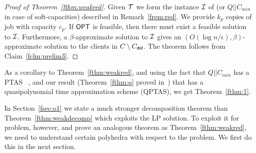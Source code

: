 \begin{proof}[Proof of Theorem~\ref{fthm:weakred}]
	Given ${\cal T}$ we form the instance ${\cal I}$  of \cckp (or $Q||C_{min}$ in case of soft-capacities) described in Remark~\ref{frem:red}. We provide $k_p$ copies of job with capacity $c_p$. If $\mathsf{OPT}$ is feasible, then there must exist a feasible solution to ${\cal I}$. Furthermore, a $\beta$-approximate solution to ${\cal I}$ gives an $\left(O(\log n/\epsilon),\beta\right)$-approximate solution to the clients in $C\setminus C_{\mathsf{del}}$. The theorem follows from Claim~\ref{fclm:prelim3}.
%	
\end{proof}

As a corollary to Theorem~\ref{fthm:weakred}, and using the fact that $Q||C_{min}$ has a PTAS ~\cite{AzarE98},  and our result (Theorem~\ref{fthm:q} proved in~) that \cckp has a quasipolynomial time approximation scheme (QPTAS), we get Theorem~\ref{fthm:1}.\medskip


In Section~\ref{fsec:o1} we state a much stronger decomposition theorem than Theorem~\ref{fthm:weakdecomp} which exploits the LP solution.
To exploit it for \mckc problem, however, and prove an analogous theorem as Theorem~\ref{fthm:weakred}, we need to understand certain polyhedra with respect to the \cckp problem.
We first do this in the next section.
